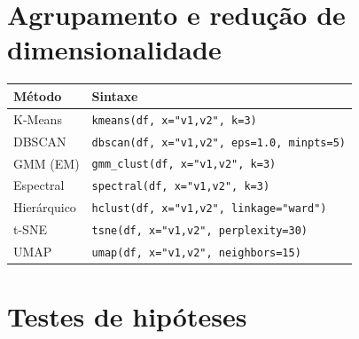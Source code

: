 \section{Agrupamento e redução de dimensionalidade}

\begin{center}
\begin{tabular}{ll}
\toprule
\textbf{Método} & \textbf{Sintaxe} \\
\midrule
K-Means           & \texttt{kmeans(df, x="v1,v2", k=3)} \\
DBSCAN            & \texttt{dbscan(df, x="v1,v2", eps=1.0, minpts=5)} \\
GMM (EM)          & \texttt{gmm\_clust(df, x="v1,v2", k=3)} \\
Espectral\textdagger{}         & \texttt{spectral(df, x="v1,v2", k=3)} \\
Hierárquico       & \texttt{hclust(df, x="v1,v2", linkage="ward")} \\
t-SNE             & \texttt{tsne(df, x="v1,v2", perplexity=30)} \\
UMAP              & \texttt{umap(df, x="v1,v2", neighbors=15)} \\
\bottomrule
\end{tabular}
\end{center}

\section{Testes de hipóteses}

